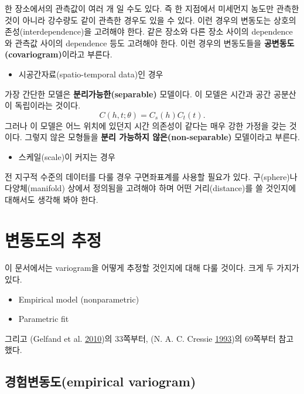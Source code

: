\documentclass[b5paper,]{book}
\providecommand{\tightlist}{%
  \setlength{\itemsep}{0pt}\setlength{\parskip}{0pt}}
\theoremstyle{definition}
\theoremstyle{definition}
\theoremstyle{definition}
\theoremstyle{remark}
\begin{document}
한 장소에서의 관측값이 여러 개 일 수도 있다. 즉 한 지점에서 미세먼지
농도만 관측한 것이 아니라 강수량도 같이 관측한 경우도 있을 수 있다. 이런
경우의 변동도는 상호의존성(interdependence)을 고려해야 한다. 같은 장소와
다른 장소 사이의 dependence와 관측값 사이의 dependence 등도 고려해야
한다. 이런 경우의 변동도들을 \textbf{공변동도(covariogram)}이라고
부른다.

\begin{itemize}
\tightlist
\item
  시공간자료(spatio-temporal data)인 경우
\end{itemize}

가장 간단한 모델은 \textbf{분리가능한(separable)} 모델이다. 이 모델은
시간과 공간 공분산이 독립이라는 것이다.
\[C(h,t;\theta)=C_{s}(h)C_{t}(t).\] 그러나 이 모델은 어느 위치에 있던지
시간 의존성이 같다는 매우 강한 가정을 갖는 것이다. 그렇지 않은 모형들을
\textbf{분리 가능하지 않은(non-separable)} 모델이라고 부른다.

\begin{itemize}
\tightlist
\item
  스케일(scale)이 커지는 경우
\end{itemize}

전 지구적 수준의 데이터를 다룰 경우 구면좌표계를 사용할 필요가 있다.
구(sphere)나 다양체(manifold) 상에서 정의됨을 고려해야 하며 어떤
거리(distance)를 쓸 것인지에 대해서도 생각해 봐야 한다.

\chapter{변동도의 추정}\label{variogramest}

이 문서에서는 variogram을 어떻게 추정할 것인지에 대해 다룰 것이다. 크게
두 가지가 있다.

\begin{itemize}
\item
  Empirical model (nonparametric)
\item
  Parametric fit
\end{itemize}

그리고 (Gelfand et al. \protect\hyperlink{ref-Gelfand2010}{2010})의
33쪽부터, (N. A. C. Cressie \protect\hyperlink{ref-Cressie1993}{1993})의
69쪽부터 참고했다.

\section{경험변동도(empirical variogram)}\label{empirical-variogram}
\end{document}
